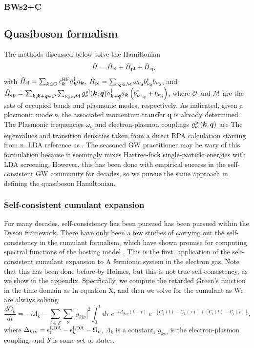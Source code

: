 \documentclass[letterpaper]{article}
\begin{document}
\subsubsection{BWs2+C}
\subsection{Quasiboson formalism}
The methods discussed below solve the Hamiltonian
\begin{align}
\hat{H}
&=
\hat{H}_{\rm el}
+
\hat{H}_{\rm pl}
+
\hat{H}_{\rm ep}
\end{align}
with $\hat{H}_{\rm el}=  \sum_{\bm{k}\in\mathcal{O}}
\epsilon_{\bm{k}}^{\rm HF}
a_{\bm{k}}^{\dagger}a_{\bm{k}}$, $\hat{H}_{\rm pl}= \sum_{\nu_{\bm{q}}\in\mathcal{M}}
\omega_{\nu_{\bm{q}}}
b_{\nu_{\bm{q}}}^{\dagger}
b_{\nu_{\bm{q}}}$, and $\hat{H}_{\rm ep}= \sum_{\bm{k},\bm{k}+\bm{q}\in\mathcal{O}}
\sum_{\nu_{\bm{q}}\in\mathcal{M}}
g_{\nu}^{\rm pl}(\bm{k},\bm{q})
a_{\bm{k}+\bm{q}}^{\dagger}
a_{\bm{k}}
\left(
b_{\nu_{-\bm{q}}}^{\dagger}
+
b_{\nu_{\bm{q}}}
\right)$, where $\mathcal{O}$ and $\mathcal{M}$ are the sets of occupied bands and plasmonic modes, respectively. As indicated, given a plasmonic mode $\nu$, the associated momentum transfer $\bm{q}$ is already determined. The Plasmonic  frequencies $\omega_{\nu_{\bm{q}}}$and electron-plasmon couplings $g_{\nu}^{\rm pl}(\bm{k},\bm{q})$ are The eigenvalues  and transition densities taken from a direct RPA calculation starting from n. LDA reference as . The seasoned GW practitioner may be wary of this formulation because it seemingly mixes Hartree-fock single-particle energies with LDA screening. However, this has been done with empirical success in the self-consistent GW community for decades, so we pursue the same approach in defining the quasiboson Hamiltonian. 

\subsubsection{Self-consistent cumulant expansion}
For many decades, self-consistency has been pursued has been pursued within the Dyson framework. There have only been a few studies of carrying out the self-consistency in the cumulant formalism, which have shown promise for computing spectral functions of the hosting model . This is the first.  application of the self-consistent cumulant expansion to A fermionic system in the electron gas. Note that this has been done before by Holmes, but this is not true self-consistency, as we show in the appendix.  Specifically, we compute the retarded Green's function in the time domain as In equation X, and then we solve for the cumulant as 
We are always solving
\begin{equation}
\frac{dC_k}{dt}=-i\Lambda_k - \sum_{i\in\mathcal{S}}\sum_\nu|g_{ki\nu}|^2\int_0^t\!d\tau\; e^{-i\Delta_{ki\nu}(t-\tau)}\; e^{-[C_k(t)-C_k(\tau)]+[C_i(t)-C_i(\tau)]},
\end{equation}
where $\Delta_{ki\nu}=\epsilon^{\rm LDA}_i-\epsilon^{\rm LDA}_k-{\Omega_\nu}$, $\Lambda_k$ is a constant, ${g_{ki\nu}}$ is the electron-plasmon coupling, and $\mathcal{S}$ is some set of states.
\end{document}

